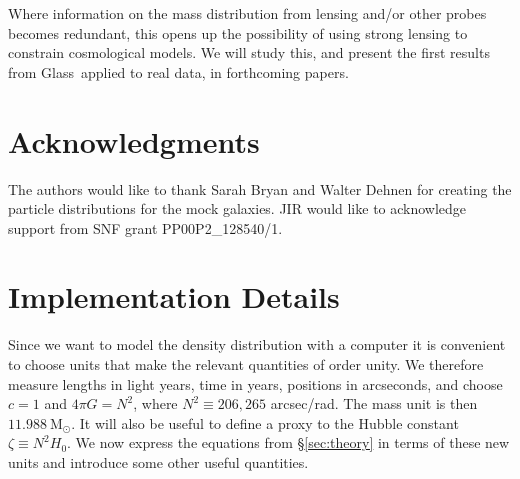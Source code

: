 \documentclass[galley,usenatbib]{mn2e}
\newcommand{\Glass}{{\sc Glass}}
\newcommand{\Msun}{\ensuremath{\mathrm{M}_\odot}}
\newcommand{\secref}[1] {\S\ref{#1}}
\begin{document}
Where information on the mass distribution from lensing and/or other probes becomes
redundant, this opens up the possibility of using strong lensing to constrain
cosmological models. We will study this, and present the first results from
\Glass\ applied to real data, in forthcoming papers.

\section{Acknowledgments}\label{sec:Acknowledgements}

The authors would like to thank Sarah Bryan and Walter Dehnen for creating the
particle distributions for the mock galaxies. JIR would like to acknowledge support from SNF grant PP00P2\_128540/1.

\appendix

\section{Implementation Details}

Since we want to model the density distribution with a computer it
is convenient to choose units that make the relevant quantities of order
unity.  We therefore measure lengths in light years, time in years, positions
in arcseconds, and choose $c=1$ and $4\pi G = N^2$, where $N^2 \equiv 206,265$
arcsec/rad. The mass unit is then $11.988\ \Msun$. It will also be useful to
define a proxy to the Hubble constant $\zeta \equiv N^2 H_0$. We now 
express the equations from \secref{sec:theory} in terms of these new units
and introduce some other useful quantities.
\end{document}
